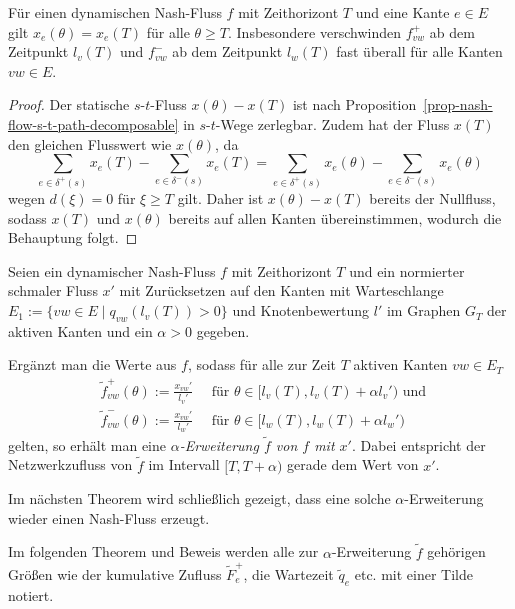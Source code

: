 \begin{proposition}
	Für einen dynamischen Nash-Fluss $f$ mit Zeithorizont $T$ und eine Kante $e\in E$ gilt $x_{e}(\theta) = x_{e}(T)$ für alle $\theta \geq T$.
	Insbesondere verschwinden $f_{vw}^+$ ab dem Zeitpunkt $l_v(T)$ und $f_{vw}^-$ ab dem Zeitpunkt $l_w(T)$ fast überall für alle Kanten $vw\in E$.
\end{proposition}
\begin{proof}
	Der statische $s$-$t$-Fluss $x(\theta) -x(T)$ ist nach Proposition~\ref{prop-nash-flow-s-t-path-decomposable} in $s$-$t$-Wege zerlegbar.
	Zudem hat der Fluss $x(T)$ den gleichen Flusswert wie $x(\theta)$, da
	\[ \sum_{e\in \delta^+(s)} x_e(T) - \sum_{e\in\delta^-(s)} x_e(T) = \sum_{e\in \delta^+(s)} x_e(\theta) - \sum_{e\in\delta^-(s)} x_e(\theta)\]
	wegen $d(\xi) = 0$ für $\xi \geq T $ gilt.
	Daher ist $x(\theta)- x(T)$ bereits der Nullfluss, sodass $x(T)$ und $x(\theta)$ bereits auf allen Kanten übereinstimmen, wodurch die Behauptung folgt.
\end{proof}

\begin{definition}
	Seien ein dynamischer Nash-Fluss $f$ mit Zeithorizont $T$ und ein normierter schmaler Fluss $x'$ mit Zurücksetzen auf den Kanten mit Warteschlange $E_1 := \{ vw\in E \mid q_{vw}(l_v(T)) > 0 \} $ und Knotenbewertung $l'$ im Graphen $G_T$ der aktiven Kanten und ein $\alpha > 0$ gegeben.
	
	Ergänzt man die Werte aus $f$, sodass für alle zur Zeit $T$ aktiven Kanten $vw\in E_T$
	\begin{align*}
	&\tilde{f}_{vw}^+(\theta):= \frac{x_{vw}'}{l_v'} \text{~~~ für $\theta\in [l_v(T), l_v(T)+\alpha l_v')$ und } \\ &\tilde{f}_{vw}^-(\theta):=\frac{x_{vw}'}{l_w'} \text{~~~ für $\theta\in [l_w(T), l_w(T)+\alpha l_w')$}
	\end{align*}
	gelten, so erhält man eine \emph{$\alpha$-Erweiterung $\tilde{f}$ von $f$ mit $x'$}.
	Dabei entspricht der Netzwerkzufluss von $\tilde{f}$ im Intervall $[T, T+\alpha)$ gerade dem Wert von $x'$.
\end{definition}

Im nächsten Theorem wird schließlich gezeigt, dass eine solche $\alpha$-Erweiterung wieder einen Nash-Fluss erzeugt.

\begin{notation}
	Im folgenden Theorem und Beweis werden alle zur $\alpha$-Erweiterung $\tilde{f}$ gehörigen Größen wie der kumulative Zufluss $\tilde{F}_e^+$, die Wartezeit $\tilde{q}_e$ etc. mit einer Tilde notiert.
\end{notation}


